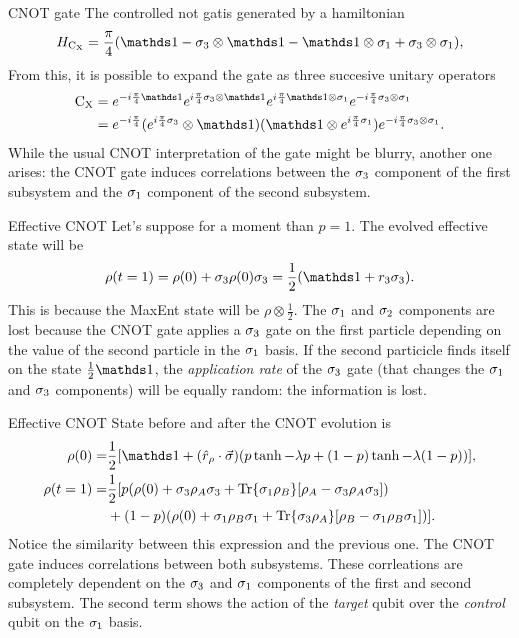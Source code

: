 \begin{frame}{CNOT gate}
    The controlled not gatis generated by a hamiltonian
    \begin{equation*}
        H_{\cnot}=\frac{\pi}{4}\qty(\Id-\pauli{3}\otimes\Id-\Id\otimes\pauli{1}+\pauli{3}\otimes\pauli{1}),
    \end{equation*}
    From this, it is possible to expand the gate as three succesive unitary operators
    \begin{align*}
        \cnot&=e^{-i\frac{\pi}{4}\Id}e^{i\frac{\pi}{4}\pauli{3}\otimes\Id}e^{i\frac{\pi}{4}\Id\otimes\pauli{1}}e^{-i\frac{\pi}{4}\pauli{3}\otimes\pauli{1}}\\
        &=e^{-i\frac{\pi}{4}} (e^{i\frac{\pi}{4}\pauli{3}}\otimes \Id) (\Id \otimes e^{i\frac{\pi}{4}\pauli{1}}) e^{-i\frac{\pi}{4}\pauli{3}\otimes\pauli{1}}.
    \end{align*}
    While the usual CNOT interpretation of the gate might be blurry, another one arises: the CNOT gate induces correlations between the $\sigma_{3}$ component of the first subsystem and the $\sigma_{1}$ component of the second subsystem.
\end{frame}

\begin{frame}{Effective CNOT}
    Let's suppose for a moment than $p=1$. The evolved effective state will be
    \begin{equation*}
      \rho(t=1)=\rho(0)+\pauli{3}\rho(0)\pauli{3}=\frac{1}{2}(\Id+r_{3}\pauli{3}).
    \end{equation*}
    This is because the MaxEnt state will be $\rho\otimes\frac{1}{2}$. The $\sigma_{1}$ and $\sigma_{2}$ components are lost because the CNOT gate applies a $\sigma_{3}$ gate on the first particle depending on the value of the second particle in the $\sigma_{1}$ basis. If the second particicle finds itself on the state $\frac{1}{2}\Id$, the \textit{application rate} of the $\sigma_{3}$ gate (that changes the $\sigma_{1}$ and $\sigma_{3}$ components) will be equally random: the information is lost.
\end{frame}

\begin{frame}{Effective CNOT}
    State before and after the CNOT evolution is
    \begin{align*}
        \rho(0)=&\frac{1}{2}[\Id+(\hat{r}_{\rho}\cdot\vec{\sigma})(p\tanh{-\lambda p}+(1-p)\tanh{-\lambda (1-p)})],\\
        \rho(t=1)=&\frac{1}{2}[p(\rho(0)+\sigma_{3}\rho_{A}\sigma_{3}+\Tr{\sigma_{1}\rho_{B}}[\rho_{A}-\sigma_{3}\rho_{A}\sigma_{3}])\\
    &+(1-p)(\rho(0)+\sigma_{1}\rho_{B}\sigma_{1}+\Tr{\sigma_{3}\rho_{A}}[\rho_{B}-\sigma_{1}\rho_{B}\sigma_{1}])].
        \end{align*}
    Notice the similarity between this expression and the previous one. The CNOT gate induces correlations between both subsystems. These corrleations are completely dependent on the $\sigma_{3}$ and $\sigma_{1}$ components of the first and second subsystem.
    The second term shows the action of the \textit{target} qubit over the \textit{control} qubit on the $\sigma_{1}$ basis.
\end{frame}

